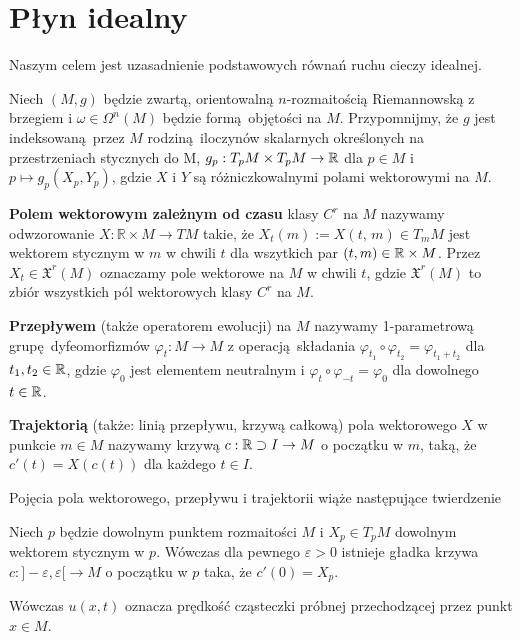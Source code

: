 \chapter{Płyn idealny} Naszym celem jest uzasadnienie podstawowych równań ruchu cieczy idealnej. 

Niech \((M, g)\) będzie zwartą, orientowalną \(n\)-rozmaitością Riemannowską z brzegiem i \(\omega \in \Omega^n(M)\) będzie formą objętości na \(M\). Przypomnijmy, że \(g\) jest indeksowaną przez \(M\) rodziną iloczynów skalarnych określonych na przestrzeniach stycznych do M, \(g_p: T_p M \times T_p M \rightarrow \mathbb{R}\) dla \(p\in M\) i \(p\mapsto g_p(X_p, Y_p)\), gdzie \(X\) i \(Y\) są różniczkowalnymi polami wektorowymi na \(M\).

\textbf{Polem wektorowym zależnym od czasu} klasy \(C^r\) na \(M\) nazywamy odwzorowanie \(X:\mathbb{R}\times M\rightarrow TM\) takie, że \(X_t(m):=X(t,\,m) \in T_{m} M\) jest wektorem stycznym w \(m\) w chwili \(t\) dla wszytkich par \((t, m) \in \mathbb{R} \times M\). Przez \(X_t\in \mathfrak{X}^r(M)\) oznaczamy pole wektorowe na \(M\) w chwili \(t\), gdzie \(\mathfrak{X}^r(M)\) to zbiór wszystkich pól wektorowych klasy \(C^r\) na \(M\). 

\textbf{Przepływem} (także operatorem ewolucji) na \(M\) nazywamy 1-parametrową grupę dyfeomorfizmów \(\varphi_t: M \rightarrow M\) z operacją składania \(\varphi_{t_1}\circ\varphi_{t_2} = \varphi_{t_1 + t_2}\) dla \(t_{1}, {t}_2 \in \mathbb{R}\), gdzie \(\varphi_0\) jest elementem neutralnym i \(\varphi_{t}\circ\varphi_{-t} = \varphi_0\) dla dowolnego \(t\in\mathbb{R}\).  

\textbf{Trajektorią} (także: linią przepływu, krzywą całkową) pola wektorowego \(X\) w punkcie \(m\in M\) nazywamy krzywą \(c: \mathbb{R} \supset I \rightarrow M\) o początku w \(m\), taką, że \(c'(t) = X(c(t))\) dla każdego \(t\in I\).

Pojęcia pola wektorowego, przepływu i trajektorii wiąże następujące twierdzenie

\begin{twierdzenie}
    Niech \(p\) będzie dowolnym punktem rozmaitości \(M\) i \(X_p\in T_p M\) dowolnym wektorem stycznym w \(p\). Wówczas dla pewnego \(\varepsilon > 0\) istnieje gładka krzywa \(c: ]-\varepsilon, \varepsilon[ \rightarrow M\) o początku w \(p\) taka, że \(c'(0) = X_p\).
\end{twierdzenie}

Wówczas \(u(x, t)\) oznacza prędkość cząsteczki próbnej przechodzącej przez punkt \(x\in M\). 
